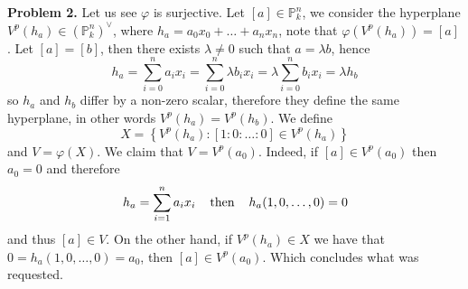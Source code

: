 \documentclass{article}
\def \P {\mathbb{P}}
\begin{document}
\vspace{5mm}
\noindent\textbf{Problem 2.} Let us see $\varphi$ is surjective. Let $[a]\in \P_{k}^{n}$, we 
consider the hyperplane $V^{p}(h_{a})\in(\P_{k}^{n})^{\lor}$, where 
$h_{a}=a_{0}x_{0}+\dots+a_{n}x_{n}$, note that $\varphi(V^{p}(h_{a}))=[a]$. Let $[a]=[b]$, then
there exists $\lambda\neq0$ such that $a=\lambda b$, hence
\begin{equation*}
    h_{a}=\sum_{i=0}^{n}a_{i}x_{i}=\sum_{i=0}^{n}\lambda b_{i}x_{i}
    =\lambda\sum_{i=0}^{n}b_{i}x_{i}=\lambda h_{b}
\end{equation*}
so $h_{a}$ and $h_{b}$ differ by a non-zero scalar, therefore they define the same hyperplane, in 
other words $V^{p}(h_{a})=V^{p}(h_{b})$. We define
\begin{equation*}
    X=\left\{V^{p}(h_{a}):[1:0:\dots:0]\in V^{p}(h_{a})\right\}
\end{equation*}
and $V=\varphi(X)$. We claim that $V=V^{p}(a_{0})$. Indeed, if $[a]\in V^{p}(a_{0})$ then 
$a_{0}=0$ and therefore
\begin{equation*}
    h_{a}=\sum_{i=1}^{n}a_{i}x_{i} \hspace{4mm}\text{then}\hspace{4mm} h_{a}(1,0,\dots,0)=0
\end{equation*}
and thus $[a]\in V$. On the other hand, if $V^{p}(h_{a})\in X$ we have that 
$0=h_{a}(1,0,\dots,0)=a_{0}$, then $[a]\in V^{p}(a_{0})$. Which concludes what was requested.
\end{document}
